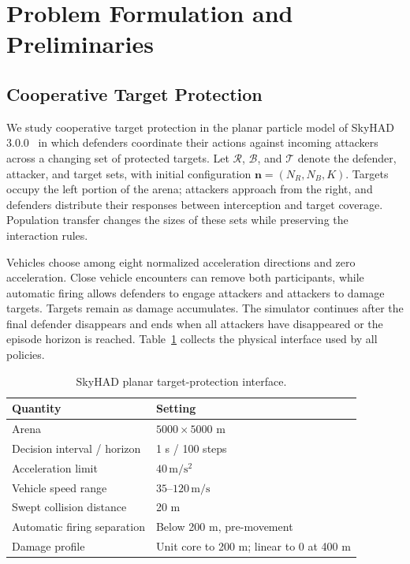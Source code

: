\section{Problem Formulation and Preliminaries}
\label{sec:problem}
\subsection{Cooperative Target Protection}
We study cooperative target protection in the planar particle model of SkyHAD 3.0.0~\cite{skyhad2026} in which defenders coordinate their actions against incoming attackers across a changing set of protected targets. Let $\mathcal R$, $\mathcal B$, and $\mathcal T$ denote the defender, attacker, and target sets, with initial configuration $\mathbf n=(N_R,N_B,K)$. Targets occupy the left portion of the arena; attackers approach from the right, and defenders distribute their responses between interception and target coverage. Population transfer changes the sizes of these sets while preserving the interaction rules.

Vehicles choose among eight normalized acceleration directions and zero acceleration. Close vehicle encounters can remove both participants, while automatic firing allows defenders to engage attackers and attackers to damage targets. Targets remain as damage accumulates. The simulator continues after the final defender disappears and ends when all attackers have disappeared or the episode horizon is reached. Table~\ref{tab:environment} collects the physical interface used by all policies.

\begin{table}[t]
\centering\footnotesize
\caption{SkyHAD planar target-protection interface.}
\label{tab:environment}
\begin{tabular}{@{}ll@{}}\toprule
Quantity & Setting\\\midrule
Arena & $5000\times5000$ m\\
Decision interval / horizon & 1 s / 100 steps\\
Acceleration limit & $40\,\mathrm{m/s^2}$\\
Vehicle speed range & $35$--$120\,\mathrm{m/s}$\\
Swept collision distance & 20 m\\
Automatic firing separation & Below 200 m, pre-movement\\
Damage profile & Unit core to 200 m; linear to 0 at 400 m\\
\bottomrule\end{tabular}
\end{table}

